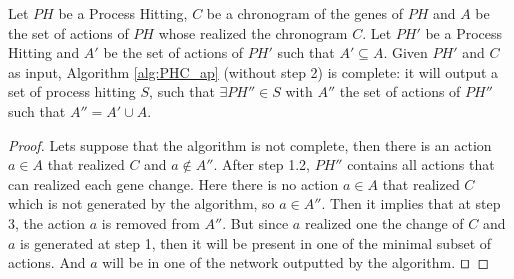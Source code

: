 \begin{theorem}[Completeness]%
	\label{th:correct}
	Let $PH$ be a Process Hitting, $C$ be a chronogram of the genes of $PH$ and $A$ be the set of actions of $PH$ whose realized the chronogram $C$.
	Let $PH'$ be a Process Hitting and $A'$ be the set of actions of $PH'$ such that $A' \subseteq A$.
	Given $PH'$ and $C$ as input, Algorithm \ref{alg:PHC_ap} (without step 2) is complete:
	it will output a set of process hitting $S$,
	such that $\exists PH'' \in S$ with $A''$ the set of actions of $PH''$ such that $A'' = A' \cup A$.
	\begin{proof}
	Lets suppose that the algorithm is not complete, then there is an action $a \in A$ that realized $C$ and $a \not \in A''$.
	After step 1.2, $PH''$ contains all actions that can realized each gene change.
	Here there is no action $a \in A$ that realized $C$ which is not generated by the algorithm, so $a \in A''$.
	Then it implies that at step 3, the action $a$ is removed from $A''$.
	But since $a$ realized one the change of $C$ and $a$ is generated at step 1, then it will be present in one of the minimal subset of actions.
	And $a$ will be in one of the network outputted by the algorithm.
	$\qed$
	\end{proof}
\end{theorem}


